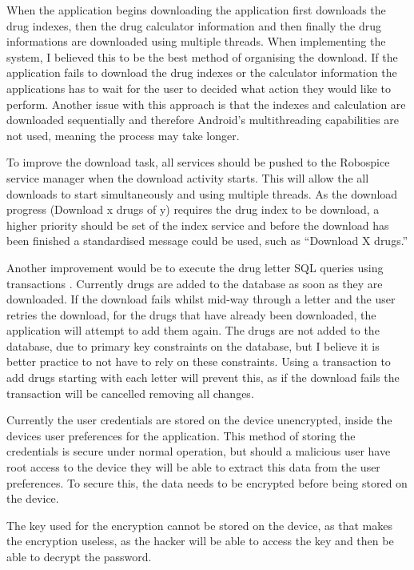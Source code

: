 When the application begins downloading the application first downloads the drug indexes, then the drug calculator information and then finally the drug informations are downloaded using multiple threads. When implementing the system, I believed this to be the best method of organising the download. If the application fails to download the drug indexes or the calculator information the applications has to wait for the user to decided what action they would like to perform. Another issue with this approach is that the indexes and calculation are downloaded sequentially and therefore Android’s multithreading capabilities are not used, meaning the process may take longer.

To improve the download task, all services should be pushed to the Robospice service manager when the download activity starts. This will allow the all downloads to start simultaneously and using multiple threads. As the download progress (Download x drugs of y) requires the drug index to be download, a higher priority should be set of the index service and before the download has been finished a standardised message could be used, such as “Download X drugs.”

Another improvement would be to execute the drug letter SQL queries using transactions \cite{sqlite}. Currently drugs are added to the database as soon as they are downloaded. If the download fails whilst mid-way through a letter and the user retries the download, for the drugs that have already been downloaded, the application will attempt to add them again. The drugs are not added to the database, due to primary key constraints on the database, but I believe it is better practice to not have to rely on these constraints. Using a transaction to add drugs starting with each letter will prevent this, as if the download fails the transaction will be cancelled removing all changes.

Currently the user credentials are stored on the device unencrypted, inside the devices user preferences \cite{shared_pref} for the application. This method of storing the credentials is secure under normal operation, but should a malicious user have root access to the device they will be able to extract this data from the user preferences. To secure this, the data needs to be encrypted before being stored on the device.

The key used for the encryption cannot be stored on the device, as that makes the encryption useless, as the hacker will be able to access the key and then be able to decrypt the password. 

